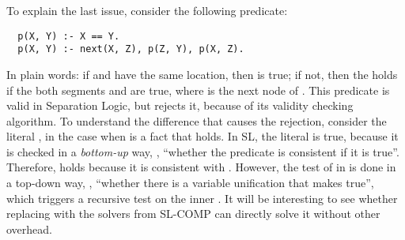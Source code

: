 To explain the last issue, consider the following \prolog predicate:
%
\begin{verbatim}
  p(X, Y) :- X == Y.
  p(X, Y) :- next(X, Z), p(Z, Y), p(X, Z).
\end{verbatim}
%
In plain words: if  and  have the same location,
then  is true; if not, then the  holds
if the both segments  and  are true,
where  is the next node of .
%
This predicate is valid in Separation Logic, but \prolog rejects it,
because of its validity checking algorithm.
%
To understand the difference that causes the rejection, consider the
literal , in the case when  is a fact
that holds.
%
In SL, the literal is true, because it is checked in a
\emph{bottom-up} way, \ie, ``whether the predicate is consistent if it is
true''. Therefore,  holds because it is consistent with .
%
However, the test of  in \prolog is done in a top-down way,
\ie, ``whether there is a variable unification that makes
 true'', which triggers a recursive
test on the inner  . It will be interesting to see whether replacing \prolog with the solvers from SL-COMP \cite{DBLP:conf/tacas/SighireanuPRGIR19} can directly solve it without other overhead.
%



